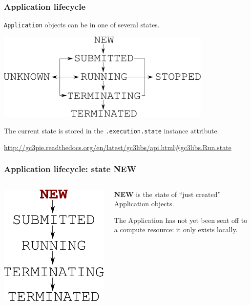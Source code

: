\documentclass[english,serif,mathserif,xcolor=pdftex,dvipsnames,table]{beamer}
\begin{document}
\begin{frame}[fragile]
\frametitle{Application lifecycle}

\texttt{Application} objects can be in one of several states.
\+
\begin{center}
  \includegraphics[width=0.8\textwidth]{fig/states}
\end{center}
\+
The current state is stored in the \texttt{.execution.state} instance attribute.

\+
\begin{references}
  \url{http://gc3pie.readthedocs.org/en/latest/gc3libs/api.html#gc3libs.Run.state}
\end{references}
\end{frame}

\begin{frame}[fragile]
\frametitle{Application lifecycle: state NEW}
\begin{columns}[c]
  \begin{column}{0.5\textwidth}
    \includegraphics[height=0.7\textheight]{fig/state-NEW}
  \end{column}
  \begin{column}{0.4\textwidth}
    \raggedleft

  \textbf{NEW} is the state of ``just created'' Application objects.
  
  \+ 
  The Application has not yet been sent off to a compute resource:
  it only exists locally.
  \end{column}
\end{columns}
\end{frame}
\end{document}
